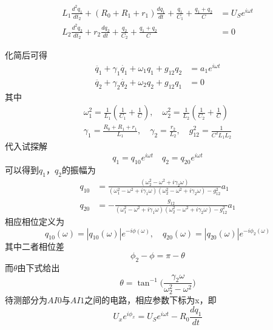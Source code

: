 \documentclass[12pt, a4paper]{ctexart}
\begin{document}
\begin{align}
    L_1 \frac{d^2 q_1}{dt_2} + (R_0 + R_1 + r_1) \frac{dq_1}{dt} + \frac{q_1}{C_1} + \frac{q_1 + q_2}{C} &= U_S e^{i\omega t}\\
    L_2 \frac{d^2 q_2}{dt_2} + r_2 \frac{dq_2}{dt} + \frac{q_2}{C_2} + \frac{q_1 + q_2}{C} &= 0
\end{align}

化简后可得
\begin{align}
    \ddot{q_1} + \gamma_1 \dot{q_1} + \omega_1 q_1 + g_{12}q_2 &= a_1 e^{i\omega t}\\
    \ddot{q_2} + \gamma_2 \dot{q_2} + \omega_2 q_2 + g_{12}q_1 &= 0
\end{align}
其中
\begin{gather*}
    \omega_1^2 = \frac{1}{L_1}(\frac{1}{C_1} + \frac{1}{C}),\quad \omega_2^2 = \frac{1}{L_2}(\frac{1}{C_2} + \frac{1}{C})\\
    \gamma_1 = \frac{R_0 + R_1 + r_1}{L_1},\quad \gamma_2 = \frac{r_2}{L_2},\quad g_{12}^2 = \frac{1}{C^2 L_1 L_2}
\end{gather*}
代入试探解
\begin{equation}
    q_1 = q_{10}e^{i\omega t}\quad q_2 = q_{20}e^{i\omega t}
\end{equation}
可以得到$q_1$，$q_2$的振幅为
\begin{align}
    q_{10} &= \frac{(\omega_2^2 - \omega^2 + i\gamma_2 \omega)}{(\omega_1^2 - \omega^2 + i\gamma_1 \omega)(\omega_2^2 - \omega^2 + i\gamma_2 \omega) - g_{12}^2}a_1\\
    q_{20} &= -\frac{g_{12}}{(\omega_1^2 - \omega^2 + i\gamma_1 \omega)(\omega_2^2 - \omega^2 + i\gamma_2 \omega) - g_{12}^2}a_1
\end{align}
相应相位定义为
\begin{equation}
    q_{10}(\omega) = |q_{10}(\omega)|e^{-i\phi (\omega)}, \quad q_{20}(\omega) = |q_{20}(\omega)|e^{-i\phi_2 (\omega)}
\end{equation}
其中二者相位差
\begin{equation*}
    \phi_2 - \phi = \pi - \theta
\end{equation*}
而$\theta$由下式给出
\begin{equation}
    \theta = \tan^{-1}\Big(\frac{\gamma_2 \omega}{\omega_2^2 - \omega^2}\Big)
\end{equation}
待测部分为$AI 0$与$AI 1$之间的电路，相应参数下标为x，即
\begin{equation*}
    U_x e^{i\phi_x} = U_S e^{i\omega t} - R_0 \frac{dq_1}{dt}
\end{equation*}
\end{document}
